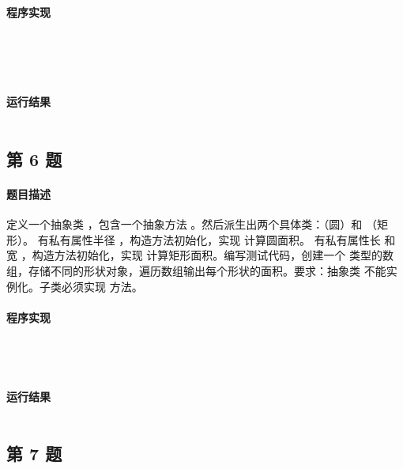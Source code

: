 \documentclass{academics}
\begin{document}
\paragraph{程序实现} {
    \inputminted[label=Animal.java]{java}{../src/P05/Animal.java}
    \inputminted[label=Dog.java]{java}{../src/P05/Dog.java}
    \inputminted[label=Cat.java]{java}{../src/P05/Cat.java}
    \inputminted[label=Zoo.java]{java}{../src/P05/Zoo.java}
    \inputminted[label=Main.java]{java}{../src/P05/Main.java}
}

\paragraph{运行结果} {
    \inputminted{text}{../res/P05.out}
}

\subsection{第 6 题}

\paragraph{题目描述} {
    定义一个抽象类 ，包含一个抽象方法 。然后派生出两个具体类：（圆）和 （矩形）。 有私有属性半径 ，构造方法初始化，实现  计算圆面积。 有私有属性长  和宽 ，构造方法初始化，实现  计算矩形面积。编写测试代码，创建一个  类型的数组，存储不同的形状对象，遍历数组输出每个形状的面积。要求：抽象类  不能实例化。子类必须实现  方法。
}

\paragraph{程序实现} {
    \inputminted[label=Shape.java]{java}{../src/P06/Shape.java}
    \inputminted[label=Circle.java]{java}{../src/P06/Circle.java}
    \inputminted[label=Rectangle.java]{java}{../src/P06/Rectangle.java}
    \inputminted[label=Main.java]{java}{../src/P06/Main.java}
}

\paragraph{运行结果} {
    \inputminted{text}{../res/P06.out}
}

\subsection{第 7 题}
\end{document}
